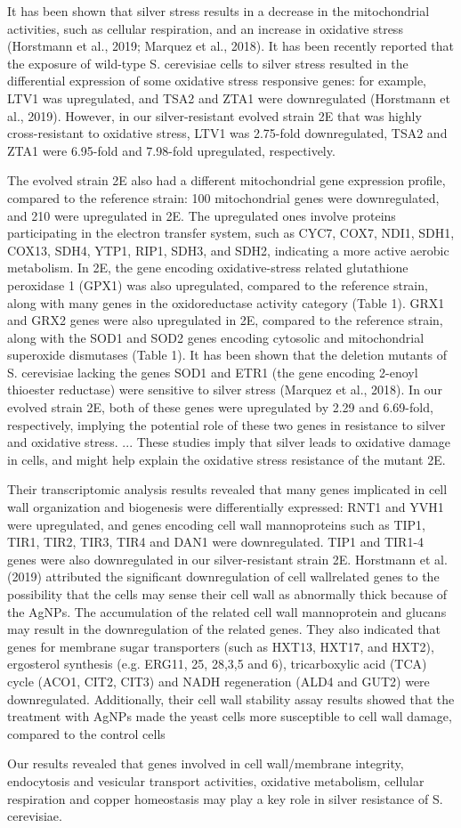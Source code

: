 It has been shown that silver stress results in a decrease in the mitochondrial activities, such as cellular respiration, and an increase in oxidative stress (Horstmann et al., 2019; Marquez et al., 2018). It has been recently reported that the exposure of wild-type S. cerevisiae cells to silver stress resulted in the differential expression of some oxidative stress responsive genes: for example, LTV1 was upregulated, and TSA2 and ZTA1 were downregulated (Horstmann et al., 2019). However, in our silver-resistant evolved strain 2E that was highly cross-resistant to oxidative stress, LTV1 was 2.75-fold downregulated, TSA2 and ZTA1 were 6.95-fold and 7.98-fold upregulated, respectively.

The evolved strain 2E also had a different mitochondrial gene expression profile,
compared to the reference strain: 100 mitochondrial genes were downregulated, and 210 were
upregulated in 2E. The upregulated ones involve proteins participating in the electron transfer system, such as CYC7, COX7, NDI1, SDH1, COX13, SDH4, YTP1, RIP1, SDH3, and SDH2, indicating a more active aerobic metabolism. In 2E, the gene encoding oxidative-stress
related glutathione peroxidase 1 (GPX1) was also upregulated, compared to the reference
strain, along with many genes in the oxidoreductase activity category (Table 1). GRX1 and
GRX2 genes were also upregulated in 2E, compared to the reference strain, along with the
SOD1 and SOD2 genes encoding cytosolic and mitochondrial superoxide dismutases (Table
1).  It has been shown that the deletion mutants of S. cerevisiae lacking the genes SOD1 and ETR1 (the gene encoding 2-enoyl thioester reductase) were sensitive to silver stress (Marquez et al., 2018). In our evolved strain 2E, both of these genes were upregulated by 2.29 and 6.69-fold, respectively, implying the potential role of these two genes in resistance to silver and oxidative stress. ...  These studies imply that silver leads to oxidative damage in cells, and might help explain the oxidative stress resistance of the mutant 2E.

Their transcriptomic analysis results revealed that many genes implicated in cell wall organization and biogenesis were differentially expressed: RNT1 and YVH1 were upregulated, and genes encoding cell wall mannoproteins such as TIP1, TIR1, TIR2, TIR3, TIR4 and DAN1 were downregulated. TIP1 and TIR1-4 genes were also downregulated in our silver-resistant strain 2E. Horstmann et al. (2019) attributed the significant downregulation of cell wallrelated genes to the possibility that the cells may sense their cell wall as abnormally thick because of the AgNPs. The accumulation of the related cell wall mannoprotein and glucans may result in the downregulation of the related genes. They also indicated that genes for membrane sugar transporters (such as HXT13, HXT17, and HXT2), ergosterol synthesis (e.g. ERG11, 25, 28,3,5 and 6), tricarboxylic acid (TCA) cycle (ACO1, CIT2, CIT3) and NADH regeneration (ALD4 and GUT2) were downregulated. Additionally, their cell wall stability assay results showed that the treatment with AgNPs made the yeast cells more susceptible to cell wall damage, compared to the control cells

Our results revealed that genes involved in cell wall/membrane integrity,
endocytosis and vesicular transport activities, oxidative metabolism, cellular respiration and
copper homeostasis may play a key role in silver resistance of S. cerevisiae.
